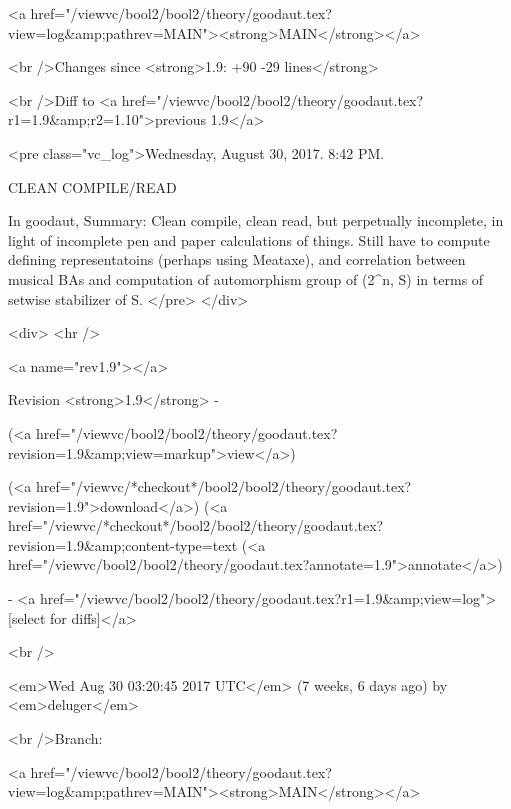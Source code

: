 <a href="/viewvc/bool2/bool2/theory/goodaut.tex?view=log&amp;pathrev=MAIN"><strong>MAIN</strong></a>







<br />Changes since <strong>1.9: +90 -29 lines</strong>








<br />Diff to <a href="/viewvc/bool2/bool2/theory/goodaut.tex?r1=1.9&amp;r2=1.10">previous 1.9</a>










<pre class="vc_log">Wednesday, August 30, 2017.  8:42 PM.

CLEAN COMPILE/READ

In goodaut,
Summary: Clean compile, clean read, but perpetually incomplete, in light
of incomplete pen and paper calculations of things.
Still have to compute defining representatoins (perhaps using Meataxe),
and correlation between musical BAs and computation of
automorphism group of (2^n, S) in terms of setwise stabilizer of
S.
</pre>
</div>



<div>
<hr />

<a name="rev1.9"></a>


Revision <strong>1.9</strong> -


(<a href="/viewvc/bool2/bool2/theory/goodaut.tex?revision=1.9&amp;view=markup">view</a>)


(<a href="/viewvc/*checkout*/bool2/bool2/theory/goodaut.tex?revision=1.9">download</a>)
(<a href="/viewvc/*checkout*/bool2/bool2/theory/goodaut.tex?revision=1.9&amp;content-type=text%
(<a href="/viewvc/bool2/bool2/theory/goodaut.tex?annotate=1.9">annotate</a>)



- <a href="/viewvc/bool2/bool2/theory/goodaut.tex?r1=1.9&amp;view=log">[select for diffs]</a>




<br />

<em>Wed Aug 30 03:20:45 2017 UTC</em>
(7 weeks, 6 days ago)
by <em>deluger</em>


<br />Branch:

<a href="/viewvc/bool2/bool2/theory/goodaut.tex?view=log&amp;pathrev=MAIN"><strong>MAIN</strong></a>







